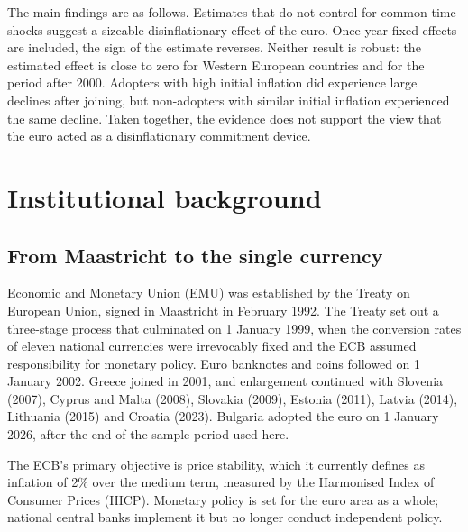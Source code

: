 \documentclass[11pt,a4paper]{article}
\numberwithin{equation}{section}
\theoremstyle{definition}
\theoremstyle{remark}
\begin{document}
The main findings are as follows. Estimates that do not control for common time shocks suggest a sizeable disinflationary effect of the euro. Once year fixed effects are included, the sign of the estimate reverses. Neither result is robust: the estimated effect is close to zero for Western European countries and for the period after 2000. Adopters with high initial inflation did experience large declines after joining, but non-adopters with similar initial inflation experienced the same decline. Taken together, the evidence does not support the view that the euro acted as a disinflationary commitment device.

\section{Institutional background}\label{sec:background}

\subsection{From Maastricht to the single currency}
Economic and Monetary Union (EMU) was established by the Treaty on European Union, signed in Maastricht in February 1992. The Treaty set out a three-stage process that culminated on 1 January 1999, when the conversion rates of eleven national currencies were irrevocably fixed and the ECB assumed responsibility for monetary policy. Euro banknotes and coins followed on 1 January 2002. Greece joined in 2001, and enlargement continued with Slovenia (2007), Cyprus and Malta (2008), Slovakia (2009), Estonia (2011), Latvia (2014), Lithuania (2015) and Croatia (2023). Bulgaria adopted the euro on 1 January 2026, after the end of the sample period used here.

The ECB's primary objective is price stability, which it currently defines as inflation of 2\% over the medium term, measured by the Harmonised Index of Consumer Prices (HICP). Monetary policy is set for the euro area as a whole; national central banks implement it but no longer conduct independent policy.
\end{document}

